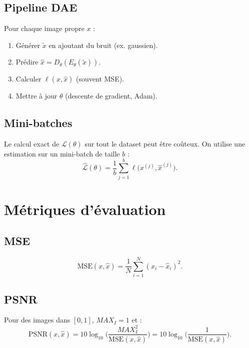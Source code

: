 \documentclass[11pt,a4paper]{article}
\newcommand{\MSE}{\mathrm{MSE}}
\newcommand{\PSNR}{\mathrm{PSNR}}
\begin{document}
\subsection{Pipeline DAE}

Pour chaque image propre $x$ :
\begin{enumerate}
  \item Générer $\tilde{x}$ en ajoutant du bruit (ex. gaussien).
  \item Prédire $\hat{x} = D_\theta(E_\theta(\tilde{x}))$.
  \item Calculer $\ell(x,\hat{x})$ (souvent MSE).
  \item Mettre à jour $\theta$ (descente de gradient, Adam).
\end{enumerate}

\subsection{Mini-batches}

Le calcul exact de $\mathcal{L}(\theta)$ sur tout le dataset peut être coûteux.
On utilise une estimation sur un mini-batch de taille $b$ :
\begin{equation}
  \widehat{\mathcal{L}}(\theta) = \frac{1}{b}\sum_{j=1}^{b}\ell\big(x^{(j)},\hat{x}^{(j)}\big).
\end{equation}

\section{Métriques d'évaluation}

\subsection{MSE}

\begin{equation}
  \MSE(x,\hat{x}) = \frac{1}{N}\sum_{i=1}^{N} (x_i-\hat{x}_i)^2.
\end{equation}

\subsection{PSNR}

Pour des images dans $[0,1]$, $MAX_I=1$ et :
\begin{equation}
  \PSNR(x,\hat{x}) = 10\log_{10}\Big(\frac{MAX_I^2}{\MSE(x,\hat{x})}\Big)=10\log_{10}\Big(\frac{1}{\MSE(x,\hat{x})}\Big).
\end{equation}
\end{document}
